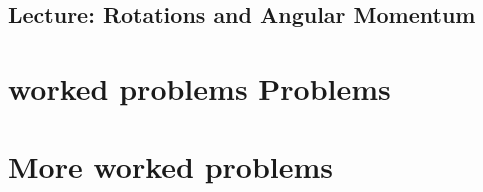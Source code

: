    \chapter{Lecture: Rotations and Angular Momentum}
      

\part{worked problems Problems}

%      

\part{More worked problems}
   
   
   
   
   
   
   


